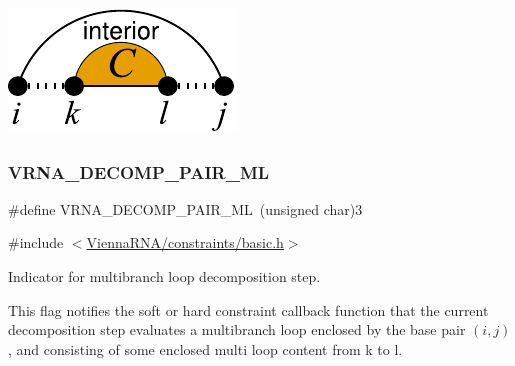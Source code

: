  
\begin{DoxyImageNoCaption}
  \mbox{\includegraphics[width=\textwidth,height=\textheight/2,keepaspectratio=true]{decomp_il}}
\end{DoxyImageNoCaption}
 \mbox{\label{group__constraints_gaa15b1185673f0b9e900c4748d45f388f}} 
\subsubsection{\texorpdfstring{VRNA\_DECOMP\_PAIR\_ML}{VRNA\_DECOMP\_PAIR\_ML}}
{\footnotesize\ttfamily \#define V\+R\+N\+A\+\_\+\+D\+E\+C\+O\+M\+P\+\_\+\+P\+A\+I\+R\+\_\+\+ML~(unsigned char)3}



{\ttfamily \#include $<$\mbox{\hyperlink{constraints_2basic_8h}{Vienna\+R\+N\+A/constraints/basic.\+h}}$>$}



Indicator for multibranch loop decomposition step. 

This flag notifies the soft or hard constraint callback function that the current decomposition step evaluates a multibranch loop enclosed by the base pair $(i,j)$, and consisting of some enclosed multi loop content from k to l.

